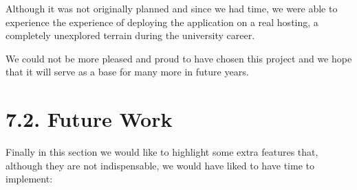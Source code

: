    Although it was not originally planned and since we had time, we were able to experience the experience of deploying the application on a real hosting, a completely unexplored terrain during the university career. \newline
   
    We could not be more pleased and proud to have chosen this project and we hope that it will serve as a base for many more in future years. \newpage
    
 \section*{7.2. Future Work}
      
Finally in this section we would like to highlight some extra features that, although they are not indispensable, we would have liked to have time to implement:
 \newline
 
